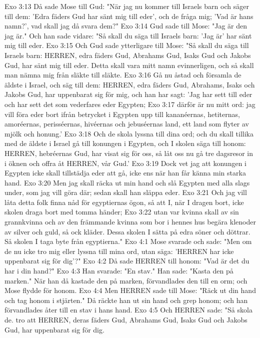 Exo 3:13  Då sade Mose till Gud: "När jag nu kommer till Israels barn och säger till dem: 'Edra fäders Gud har sänt mig till eder', och de fråga mig; 'Vad är hans namn?', vad skall jag då svara dem?"
Exo 3:14  Gud sade till Mose: "Jag är den jag är." Och han sade vidare: "Så skall du säga till Israels barn: 'Jag är' har sänt mig till eder.
Exo 3:15  Och Gud sade ytterligare till Mose: "Så skall du säga till Israels barn: HERREN, edra fäders Gud, Abrahams Gud, Isaks Gud och Jakobs Gud, har sänt mig till eder. Detta skall vara mitt namn evinnerligen, och så skall man nämna mig från släkte till släkte.
Exo 3:16  Gå nu åstad och församla de äldste i Israel, och säg till dem: HERREN, edra fäders Gud, Abrahams, Isaks och Jakobs Gud, har uppenbarat sig för mig, och han har sagt: 'Jag har sett till eder och har sett det som vederfares eder Egypten;
Exo 3:17  därför är nu mitt ord: jag vill föra eder bort ifrån betrycket i Egypten upp till kananéernas, hetiternas, amoréernas, perisséernas, hivéernas och jebuséernas land, ett land som flyter av mjölk och honung.'
Exo 3:18  Och de skola lyssna till dina ord; och du skall tillika med de äldste i Israel gå till konungen i Egypten, och I skolen säga till honom: HERREN, hebréernas Gud, har visat sig för oss, så låt oss nu gå tre dagsresor in i öknen och offra åt HERREN, vår Gud.'
Exo 3:19  Dock vet jag att konungen i Egypten icke skall tillstädja eder att gå, icke ens när han får känna min starka hand.
Exo 3:20  Men jag skall räcka ut min hand och slå Egypten med alla slags under, som jag vill göra där; sedan skall han släppa eder.
Exo 3:21  Och jag vill låta detta folk finna nåd för egyptiernas ögon, så att I, när I dragen bort, icke skolen draga bort med tomma händer;
Exo 3:22  utan var kvinna skall av sin grannkvinna och av den främmande kvinna som bor i hennes hus begära klenoder av silver och guld, så ock kläder. Dessa skolen I sätta på edra söner och döttrar. Så skolen I taga byte från egyptierna."
Exo 4:1  Mose svarade och sade: "Men om de nu icke tro mig eller lyssna till mina ord, utan säga: 'HERREN har icke uppenbarat sig för dig'?"
Exo 4:2  Då sade HERREN till honom: "Vad är det du har i din hand?"
Exo 4:3  Han svarade: "En stav." Han sade: "Kasta den på marken." När han då kastade den på marken, förvandlades den till en orm; och Mose flydde för honom.
Exo 4:4  Men HERREN sade till Mose: "Räck ut din hand och tag honom i stjärten." Då räckte han ut sin hand och grep honom; och han förvandlades åter till en stav i hans hand.
Exo 4:5  Och HERREN sade: "Så skola de. tro att HERREN, deras fäders Gud, Abrahams Gud, Isaks Gud och Jakobs Gud, har uppenbarat sig för dig.
